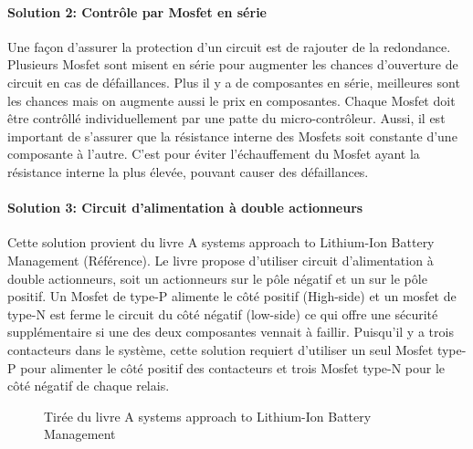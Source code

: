 		
		\paragraph*{Solution 2: Contrôle par Mosfet en série}
		Une façon d'assurer la protection d'un circuit est de rajouter de la redondance. Plusieurs Mosfet sont misent en série pour augmenter les chances d'ouverture de circuit en cas de défaillances. Plus il y a de composantes en série, meilleures sont les chances mais on augmente aussi le prix en composantes. Chaque Mosfet doit être contrôllé individuellement par une patte du micro-contrôleur. Aussi, il est important de s'assurer que la résistance interne des Mosfets soit constante d'une composante à l'autre. C'est pour éviter l'échauffement du Mosfet ayant la résistance interne la plus élevée, pouvant causer des défaillances.

		\paragraph*{Solution 3: Circuit d'alimentation à double actionneurs}
		Cette solution provient du livre A systems approach to Lithium-Ion Battery Management (Référence). Le livre propose d'utiliser circuit d'alimentation à double actionneurs, soit un actionneurs sur le pôle négatif et un sur le pôle positif. Un Mosfet de type-P alimente le côté positif (High-side) et un mosfet de type-N est ferme le circuit du côté négatif (low-side) ce qui offre une sécurité supplémentaire si une des deux composantes vennait à faillir. Puisqu'il y a trois contacteurs dans le système, cette solution requiert d'utiliser un seul Mosfet type-P pour alimenter le côté positif des contacteurs et trois Mosfet type-N pour le côté négatif de chaque relais.

		\begin{figure}
			\centering
			\caption[Circuit d'alimentation des contacteurs à double actionneurs]{Tirée du livre A systems approach to Lithium-Ion Battery Management}
			\label{fig:dualcontactordrive}
		\end{figure}

